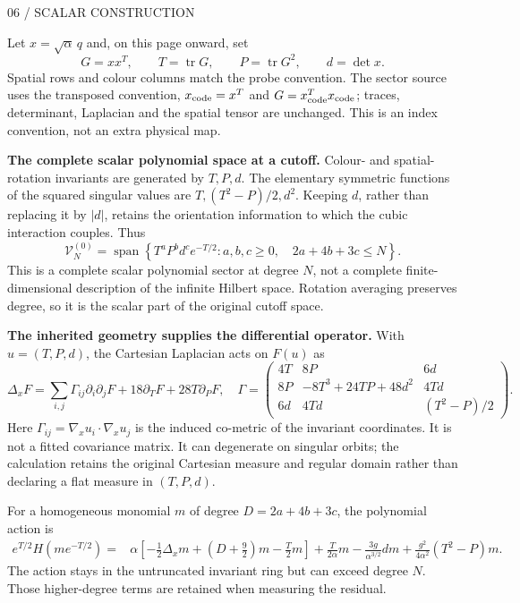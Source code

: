 \documentclass[11pt,letterpaper]{article}
\theoremstyle{plain}
\theoremstyle{definition}
\newcommand{\eyebrow}[1]{{\sffamily\small\color{teal}#1}\par}
\newcommand{\pagetitle}[2]{\eyebrow{#1}\vspace{3pt}{\LARGE #2}\par\vspace{5pt}}
\begin{document}
\newpage
\pagetitle{06 / SCALAR CONSTRUCTION}{Put the operator in the geometry's own coordinates}
Let $x=\sqrt{\alpha}\,q$ and, on this page onward, set
\[
 G=xx^T,\qquad T=\operatorname{tr}G,\qquad
 P=\operatorname{tr}G^2,\qquad d=\det x.
\]
Spatial rows and colour columns match the probe convention. The sector source
uses the transposed convention, $x_{\rm code}=x^T$ and
$G=x_{\rm code}^Tx_{\rm code}$; traces, determinant, Laplacian and the spatial
tensor are unchanged. This is an index convention, not an extra physical map.

\textbf{The complete scalar polynomial space at a cutoff.}
Colour- and spatial-rotation invariants are generated by $T,P,d$. The elementary
symmetric functions of the squared singular values are
$T,(T^2-P)/2,d^2$. Keeping $d$, rather than replacing it by $|d|$, retains the
orientation information to which the cubic interaction couples. Thus
\[
 \mathcal V_N^{(0)}=\operatorname{span}\left\{
 T^aP^bd^c e^{-T/2}:a,b,c\geq0,\quad 2a+4b+3c\leq N\right\}.
\]
This is a complete scalar polynomial sector at degree $N$, not a complete
finite-dimensional description of the infinite Hilbert space. Rotation averaging
preserves degree, so it is the scalar part of the original cutoff space.

\textbf{The inherited geometry supplies the differential operator.}
With $u=(T,P,d)$, the Cartesian Laplacian acts on $F(u)$ as
\[
 \Delta_x F=\sum_{i,j}\Gamma_{ij}\partial_i\partial_jF
               +18\partial_TF+28T\partial_PF,
\quad
 \Gamma=\begin{pmatrix}
 4T&8P&6d\\
 8P&-8T^3+24TP+48d^2&4Td\\
 6d&4Td&(T^2-P)/2
 \end{pmatrix}.
\]
Here $\Gamma_{ij}=\nabla_xu_i\cdot\nabla_xu_j$ is the induced co-metric of
the invariant coordinates. It is not a fitted covariance matrix. It can
degenerate on singular orbits; the calculation retains the original Cartesian
measure and regular domain rather than declaring a flat measure in $(T,P,d)$.

For a homogeneous monomial $m$ of degree $D=2a+4b+3c$, the polynomial action is
\begin{align*}
 e^{T/2}H(me^{-T/2})={}&
 \alpha\left[-\tfrac12\Delta_xm+(D+\tfrac92)m-\tfrac T2m\right]
 +\frac{T}{2\alpha}m-\frac{3g}{\alpha^{3/2}}dm
 +\frac{g^2}{4\alpha^2}(T^2-P)m.
\end{align*}
The action stays in the untruncated invariant ring but can exceed degree $N$.
Those higher-degree terms are retained when measuring the residual.
\end{document}

